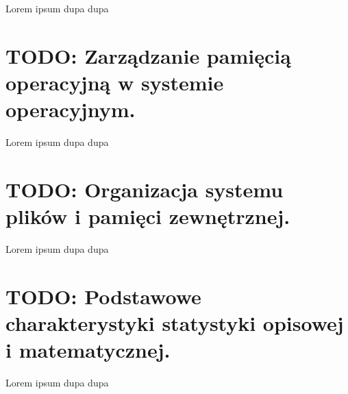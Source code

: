 \documentclass[a4paper,12pt,oneside]{book}
\begin{document}
						Lorem ipsum dupa dupa
	
	\setcounter{section}{25}
	\section{\color{red} TODO: Zarządzanie pamięcią operacyjną w systemie operacyjnym. }
						
						Lorem ipsum dupa dupa
	
	\setcounter{section}{26}
	\section{\color{red} TODO: Organizacja systemu plików i pamięci zewnętrznej. }
						
						Lorem ipsum dupa dupa
						
	\setcounter{section}{2}
	\section{\color{red} TODO: Podstawowe charakterystyki statystyki opisowej i matematycznej.}
							
							Lorem ipsum dupa dupa
	
	
	
	
\end{document}
